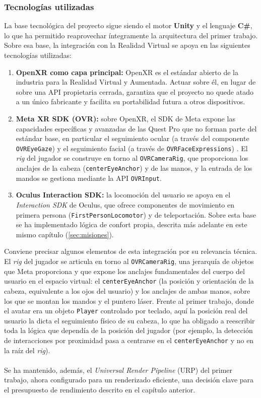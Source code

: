 \documentclass[12pt,twoside,titlepage]{report}
\begin{document}
\subsubsection{Tecnologías utilizadas}

La base tecnológica del proyecto sigue siendo el motor \textbf{Unity} y el lenguaje \textbf{C\#}, lo que ha permitido reaprovechar íntegramente la arquitectura del primer trabajo.
Sobre esa base, la integración con la Realidad Virtual se apoya en las siguientes tecnologías utilizadas:

\begin{enumerate}[label=\textbf{\arabic*.}, leftmargin=1.5cm, itemsep=0.5em]
  \item \textbf{OpenXR como capa principal:} OpenXR \parencite{openxr} es el estándar abierto de la industria para la Realidad Virtual y Aumentada.
Actuar sobre él, en lugar de sobre una API propietaria cerrada, garantiza que el proyecto no quede atado a un único fabricante y facilita su portabilidad futura a otros dispositivos.
  \item \textbf{Meta XR SDK (OVR):} sobre OpenXR, el SDK de Meta expone las capacidades específicas y avanzadas de las Quest Pro que no forman parte del estándar base, en particular el seguimiento ocular (a través del componente \texttt{OVREyeGaze}) y el seguimiento facial (a través de \texttt{OVRFaceExpressions}) \parencite{metaovr}.
El \textit{rig} del jugador se construye en torno al \texttt{OVRCameraRig}, que proporciona los anclajes de la cabeza (\texttt{centerEyeAnchor}) y de las manos, y la entrada de los mandos se gestiona mediante la API \texttt{OVRInput}.
  \item \textbf{Oculus Interaction SDK:} la locomoción del usuario se apoya en el \textit{Interaction SDK} de Oculus, que ofrece componentes de movimiento en primera persona (\texttt{FirstPersonLocomotor}) y de teleportación.
Sobre esta base se ha implementado lógica de confort propia, descrita más adelante en este mismo capítulo (\ref{sec:misiones}).
\end{enumerate}

Conviene precisar algunos elementos de esta integración por su relevancia técnica.
El \textit{rig} del jugador se articula en torno al \texttt{OVRCameraRig}, una jerarquía de objetos que Meta proporciona y que expone los anclajes fundamentales del cuerpo del usuario en el espacio virtual: el \texttt{centerEyeAnchor} (la posición y orientación de la cabeza, equivalente a los ojos del usuario) y los anclajes de ambas manos, sobre los que se montan los mandos y el puntero láser.
Frente al primer trabajo, donde el avatar era un objeto \texttt{Player} controlado por teclado, aquí la posición real del usuario la dicta el seguimiento físico de su cabeza, lo que ha obligado a reescribir toda la lógica que dependía de la posición del jugador (por ejemplo, la detección de interacciones por proximidad pasa a centrarse en el \texttt{centerEyeAnchor} y no en la raíz del \textit{rig}).\\
\\
Se ha mantenido, además, el \textit{Universal Render Pipeline} (URP) del primer trabajo, ahora configurado para un renderizado eficiente, una decisión clave para el presupuesto de rendimiento descrito en el capítulo anterior.
\end{document}
